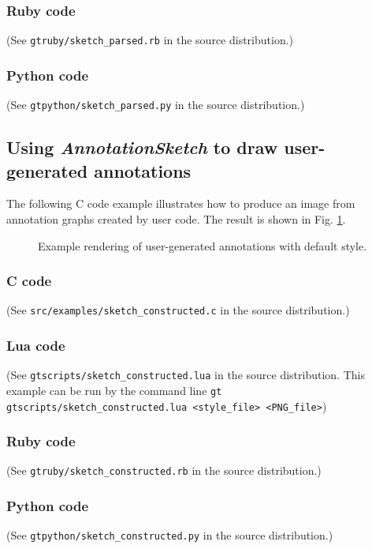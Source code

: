 \documentclass[a4paper]{scrreprt}
\begin{document}
\subsubsection{Ruby code}
(See \texttt{gtruby/sketch\_parsed.rb} in the source distribution.)

\subsubsection{Python code}
(See \texttt{gtpython/sketch\_parsed.py} in the source distribution.)


\subsection{Using \emph{AnnotationSketch} to draw user-generated annotations}
The following C code example illustrates how to produce an image from annotation graphs created by user code.
 The result is shown in Fig. \ref{constructed_img}.

\begin{figure}
\caption{Example rendering of user-generated annotations with default style.}
\label{constructed_img}
\end{figure}

\subsubsection{C code}
(See \texttt{src/examples/sketch\_constructed.c} in the source distribution.)

\subsubsection{Lua code}
(See \texttt{gtscripts/sketch\_constructed.lua} in the source distribution.  This example can be run by the command line \texttt{gt gtscripts/sketch\_constructed.lua <style\_file> <PNG\_file>})

\subsubsection{Ruby code}
(See \texttt{gtruby/sketch\_constructed.rb} in the source distribution.)

\subsubsection{Python code}
(See \texttt{gtpython/sketch\_constructed.py} in the source distribution.)


\lstset{%
  language=c,
  basicstyle=\footnotesize\ttfamily,
  numbers=none,
}

%
\end{document}
